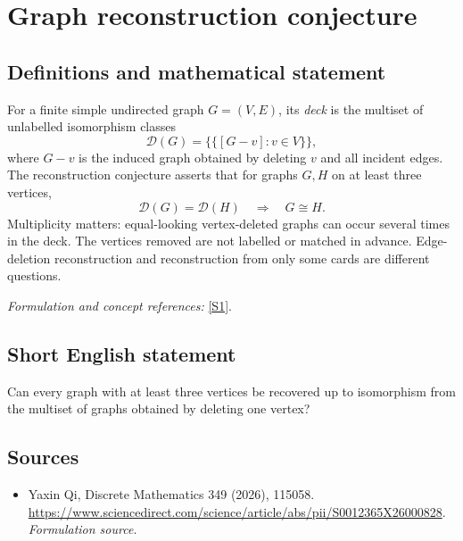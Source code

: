 \documentclass[11pt]{article}
\begin{document}
\section*{\texorpdfstring{Graph reconstruction conjecture}{Graph reconstruction conjecture}}\label{335}
\subsection{Definitions and mathematical statement}
For a finite simple undirected graph $G=(V,E)$, its \emph{deck} is the multiset of unlabelled isomorphism classes
\[
 \mathcal D(G)=\bigl\{\!\bigl\{[G-v]:v\in V\bigr\}\!\bigr\},
\]
where $G-v$ is the induced graph obtained by deleting $v$ and all incident edges. The reconstruction conjecture asserts that for graphs $G,H$ on at least three vertices,
\[
 \mathcal D(G)=\mathcal D(H)\quad\Longrightarrow\quad G\cong H.
\]
Multiplicity matters: equal-looking vertex-deleted graphs can occur several times in the deck. The vertices removed are not labelled or matched in advance. Edge-deletion reconstruction and reconstruction from only some cards are different questions.
\par\smallskip\textit{Formulation and concept references:} \href{https://www.sciencedirect.com/science/article/abs/pii/S0012365X26000828}{[S1]}.

\subsection{Short English statement}
Can every graph with at least three vertices be recovered up to isomorphism from the multiset of graphs obtained by deleting one vertex?
\subsection{Sources}
\begin{itemize}
\item[S1]Yaxin Qi, Discrete Mathematics 349 (2026), 115058.
\url{https://www.sciencedirect.com/science/article/abs/pii/S0012365X26000828}.
\textit{Formulation source.}
\end{itemize}
\end{document}
